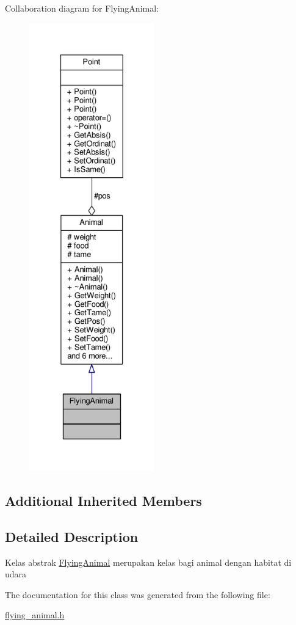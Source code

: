 Collaboration diagram for Flying\+Animal\+:
\nopagebreak
\begin{figure}[H]
\begin{center}
\leavevmode
\includegraphics[height=550pt]{classFlyingAnimal__coll__graph}
\end{center}
\end{figure}
\subsection*{Additional Inherited Members}


\subsection{Detailed Description}
Kelas abstrak \hyperlink{classFlyingAnimal}{Flying\+Animal} merupakan kelas bagi animal dengan habitat di udara 

The documentation for this class was generated from the following file\+:\begin{DoxyCompactItemize}
\item 
\hyperlink{flying__animal_8h}{flying\+\_\+animal.\+h}\end{DoxyCompactItemize}
